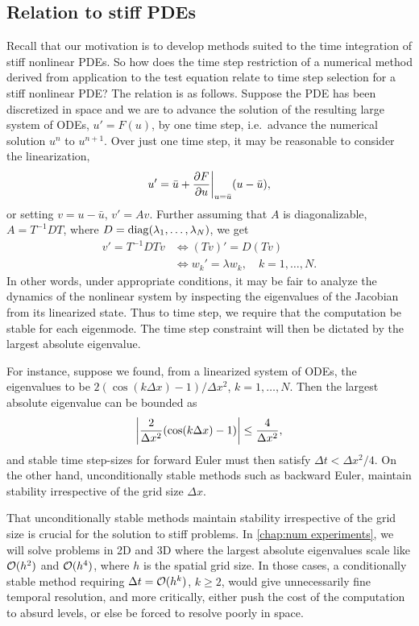 \subsection{Relation to stiff PDEs}
Recall that our motivation is to develop methods suited to the time integration of stiff nonlinear PDEs. So how does the time step restriction of a numerical method derived from application to the test equation relate to time step selection for a stiff nonlinear PDE? The relation is as follows. Suppose the PDE has been discretized in space and we are to advance the solution of the resulting large system of ODEs, $u' = F(u)$, by one time step, i.e.\ advance the numerical solution $u^n$ to $u^{n+1}$. Over just one time step, it may be reasonable to consider the linearization, 
\begin{align*}
        u' = \bar u + \frac{\partial F}{\partial u} \bigg|_{u=\bar u} (u-\bar u), 
\end{align*}
or setting $v=u-\bar u$, $v' = Av$. Further assuming that $A$ is diagonalizable, $A=T^{-1}DT$, where $D=\operatorname{diag}(\lambda_1,\dots,\lambda_N)$, we get 
\begin{align}
        v' = T^{-1}DTv 
&\iff (Tv)' = D(Tv)
\\&\iff w_k' = \lambda w_k, \quad k=1,\dots, N.
\end{align}
In other words, under appropriate conditions, it may be fair to analyze the dynamics of the nonlinear system by inspecting the eigenvalues of the Jacobian from its linearized state. Thus to time step, we require that the computation be stable for each eigenmode. The time step constraint will then be dictated by the largest absolute eigenvalue.

For instance, suppose we found, from a linearized system of ODEs, the eigenvalues to be $2(\cos(k\Delta x) -1)/\Delta x^2$, $k=1,\dots,N$. Then the largest absolute eigenvalue can be bounded as 
\begin{align}
    \left|\frac{2}{\Delta x^2}(\cos(k\Delta x) -1)\right| \leq \frac{4}{\Delta x^2},
\end{align}
and stable time step-sizes for forward Euler must then satisfy $\Delta t < \Delta x^2/4$. On the other hand, unconditionally stable methods such as backward Euler, maintain stability irrespective of the grid size $\Delta x$.

That unconditionally stable methods maintain stability irrespective of the grid size is crucial for the solution to stiff problems. In \cref{chap:num experiments}, we will solve problems in 2D and 3D where the largest absolute eigenvalues scale like $\mathcal{O}(h^2)$ and $\mathcal{O}(h^4)$, where $h$ is the spatial grid size. In those cases, a conditionally stable method requiring $\Delta t = \mathcal{O}(h^k)$, $k\geq 2$, would give unnecessarily fine temporal resolution, and more critically, either push the cost of the computation to absurd levels, or else be forced to resolve poorly in space.

